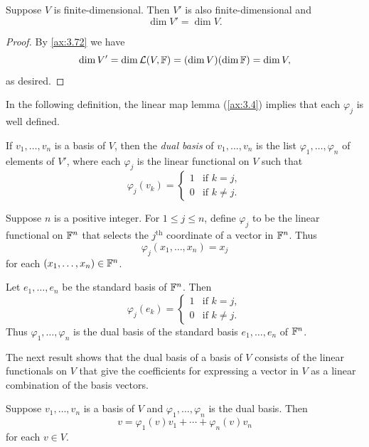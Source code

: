\begin{result}[$\dim V'=\dim V$]\label{ax:3.111}
Suppose $V$ is finite-dimensional. Then $V'$ is also finite-dimensional and
\[ \dim V' = \dim V. \]
\end{result}

\begin{proof}
By \ref{ax:3.72} we have
\[ \operatorname{dim} V' = \operatorname{dim}\mathcal{L}(V,\mathbb{F}) = (\operatorname{dim} V)(\operatorname{dim}\mathbb{F}) = \operatorname{dim} V, \]
as desired.
\end{proof}

In the following definition, the linear map lemma (\ref{ax:3.4}) implies that
each $\varphi_j$ is well defined.

\begin{definition}\label{ax:3.112}
If $v_1,\dots,v_n$ is a basis of $V$, then the \emph{dual basis} of
$v_1,\dots,v_n$ is the list $\varphi_1,\dots,\varphi_n$ of elements of $V'$,
where each $\varphi_j$ is the linear functional on $V$ such that
\[ \varphi_j(v_k) = \begin{cases} 1 & \text{if } k=j,\\
                                 0 & \text{if } k\ne j. \end{cases} \]
\end{definition}

\begin{example}\label{ax:3.113}
Suppose $n$ is a positive integer. For $1\le j\le n$, define $\varphi_j$ to be
the linear functional on $\mathbb{F}^n$ that selects the $j^{\text{th}}$ coordinate of a
vector in $\mathbb{F}^n$. Thus
\[ \varphi_j(x_1,\dots,x_n) = x_j \]
for each $(x_1,\dots,x_n)\in\mathbb{F}^n$.

Let $e_1,\dots,e_n$ be the standard basis of $\mathbb{F}^n$. Then
\[ \varphi_j(e_k) = \begin{cases} 1 & \text{if } k=j,\\
                                 0 & \text{if } k\ne j. \end{cases} \]
Thus $\varphi_1,\dots,\varphi_n$ is the dual basis of the standard basis
$e_1,\dots,e_n$ of $\mathbb{F}^n$.
\end{example}

The next result shows that the dual basis of a basis of $V$ consists of the
linear functionals on $V$ that give the coefficients for expressing a vector in
$V$ as a linear combination of the basis vectors.

\begin{result}\label{ax:3.114}
Suppose $v_1,\dots,v_n$ is a basis of $V$ and $\varphi_1,\dots,\varphi_n$ is the
dual basis. Then
\[ v = \varphi_1(v)v_1+\cdots+\varphi_n(v)v_n \]
for each $v\in V$.
\end{result}

